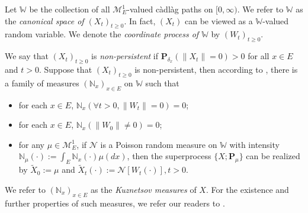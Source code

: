 \documentclass[12pt,a4paper]{amsart}
\theoremstyle{definition}
\numberwithin{equation}{section}
\begin{document}
Let $\mathbb W$ be the collection of all $\mathcal M^1_E$-valued c\`{a}dl\`{a}g paths on $[0,\infty)$.
We refer to $\mathbb W$ as the \emph{canonical space of $(X_t)_{t\geq 0}$}.
In fact, $(X_t)$ can be viewed as a $\mathbb W$-valued random variable.
We denote the \emph{coordinate process of $\mathbb W$} by $(W_t)_{t\geq 0}$.

We say that $(X_t)_{t\geq 0}$ is \emph{non-persistent} if $\mathbf P_{\delta_x}(\|X_t\|= 0) > 0$ for all $x\in E$ and $t> 0$.
Suppose that $(X_t)_{t\geq 0}$ is non-persistent, then according to \cite[Section 8.4]{Li2011Measure-valued}, there is a family of measures $(\mathbb N_x)_{x\in E}$ on $\mathbb W$ such that
\begin{itemize}
\item
	for each $x\in E$, $\mathbb N_x (\forall t > 0, \|W_t\|=0) =0$;
\item
	for each $x\in E$, $\mathbb N_x(\|W_0 \|\neq 0) = 0$;
\item
	for any $\mu \in \mathcal M_E^1$, if $\mathcal N$ is a Poisson random measure on $\mathbb W$ with intensity $\mathbb N_\mu(\cdot):= \int_E \mathbb N_x(\cdot )\mu(dx)$, then the superprocess $\{X;\mathbf P_\mu\}$ can be realized by $\widetilde X_0 := \mu$ and $\widetilde X_t(\cdot) := \mathcal N[W_t(\cdot)],t>0$.
\end{itemize}
We refer to $(\mathbb N_x)_{x\in E}$ as the \emph{Kuznetsov measures} of $X$.
For the existence and further properties of such measures, we refer our readers to \cite{Li2011Measure-valued}.
\end{document}
